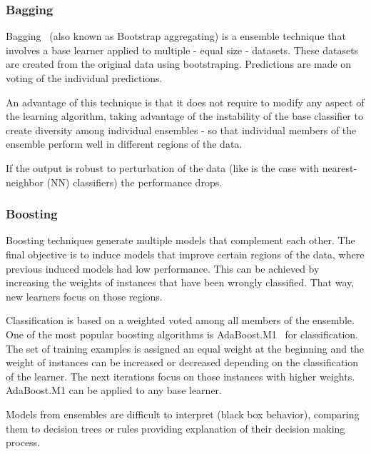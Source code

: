 \subsubsection{Bagging}

Bagging~\cite{Breiman96} (also known as Bootstrap aggregating) is a ensemble 
technique that involves a base learner applied to multiple - equal size - 
datasets. These datasets are created from the original data using bootstraping. 
Predictions are made on voting of the individual predictions. 

An advantage of this technique is that it does not require to modify
any aspect of the learning algorithm, taking advantage of the instability of 
the base classifier to create diversity among individual ensembles - so that 
individual members of the ensemble perform well in different regions of the 
data.  

If the output is robust to perturbation of the data (like is the case with
nearest-neighbor (NN) classifiers) the performance drops.

\subsubsection{Boosting}

Boosting techniques generate multiple models that complement each other. The
final objective is to induce models that improve certain regions of the data,
where previous induced models had low performance. This can be achieved by 
increasing the weights of instances that have been wrongly classified. That 
way, new learners focus on those regions. 

Classification is based on a weighted voted among all members of the ensemble.
One of the most popular boosting algorithms is AdaBoost.M1~\cite{Freund1996} 
for classification. The set of training examples is assigned an equal weight 
at the beginning and the weight of instances can be increased or decreased 
depending on the classification of the learner. The next iterations focus on 
those instances with higher weights. AdaBoost.M1 can be applied to any base 
learner.

Models from ensembles are difficult to interpret (black box behavior), 
comparing them to decision trees or rules providing explanation of their 
decision making process.

